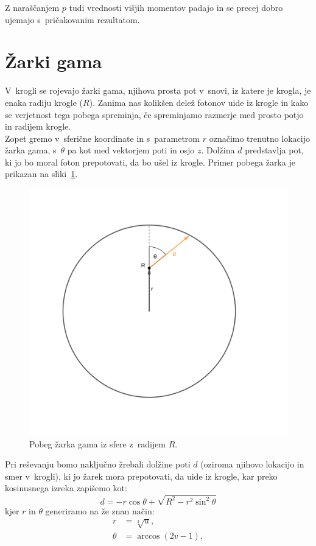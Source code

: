\documentclass[a4paper,pdftex,10pt]{article}
\numberwithin{figure}{section} %
\begin{document}
Z naraščanjem $p$ tudi vrednosti višjih momentov padajo in se precej dobro ujemajo 
s~pričakovanim rezultatom.

\pagebreak

\section{Žarki gama}
V~krogli se rojevajo žarki gama, njihova prosta pot v~snovi, iz katere je krogla, je enaka 
radiju krogle ($R$). Zanima nas kolikšen delež fotonov uide iz krogle in kako se verjetnost
tega pobega spreminja, če spreminjamo razmerje med prosto potjo in radijem krogle.\\
Zopet gremo v~sferične koordinate in s~parametrom $r$ označimo trenutno lokacijo žarka
gama, s~$\theta$ pa kot med vektorjem poti in osjo $z$. Dolžina $d$ predstavlja pot,
ki jo bo moral foton prepotovati, da bo ušel iz krogle. Primer pobega žarka je prikazan
na sliki~\ref{slika4}.
\begin{figure}
    \centering 
    \includegraphics[width=.60\linewidth]{pobeg} 
    \caption{Pobeg žarka gama iz sfere z~radijem $R$.}
    \label{slika4} 
\end{figure}
Pri reševanju bomo naključno žrebali dolžine poti $d$ (oziroma njihovo lokacijo in smer
v~krogli), ki jo žarek mora prepotovati, da uide iz krogle, kar preko kosinusnega 
izreka zapišemo kot:
\begin{equation}
    d = -r\cos\theta + \sqrt{R^2 - r^2 \sin^2 \theta}
\end{equation}
kjer $r$ in $\theta$ generiramo na že znan način: 
\begin{align}
    r &= \sqrt[3]{u}, \\
    \theta &= \arccos(2v-1),
\end{align}
\end{document}

